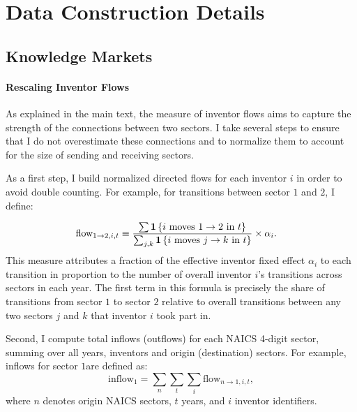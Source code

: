 
\appendix

\section{Data Construction Details\label{app: Data-Construction-Details}}

\subsection{Knowledge Markets}

\paragraph{Rescaling Inventor Flows}

As explained in the main text, the measure of inventor flows aims
to capture the strength of the connections between two sectors. I
take several steps to ensure that I do not overestimate these connections
and to normalize them to account for the size of sending and receiving
sectors. 

As a first step, I build normalized directed flows for each inventor
$i$ in order to avoid double counting. For example, for transitions
between sector $1$ and $2$, I define:

\begin{align*}
\text{flow}_{1\rightarrow2,i,t} & \equiv\frac{\sum\text{\ensuremath{\bm{1}\left\{ i\text{ moves }1\rightarrow2\text{ in }t\right\} }}}{\sum_{j,k}\text{\ensuremath{\bm{1}\left\{ i\text{ moves }j\rightarrow k\text{ in }t\right\} }}}\times\alpha_{i}.
\end{align*}
This measure attributes a fraction of the effective inventor fixed
effect $\alpha_{i}$ to each transition in proportion to the number
of overall inventor $i$'s transitions across sectors in each year.
The first term in this formula is precisely the share of transitions
from sector $1$ to sector $2$ relative to overall transitions between
any two sectors $j$ and $k$ that inventor $i$ took part in.

Second, I compute total inflows (outflows) for each NAICS 4-digit
sector, summing over all years, inventors and origin (destination)
sectors. For example, inflows for sector $1$are defined as:
\[
\text{inflow}_{1}=\sum_{n}\sum_{t}\sum_{i}\text{flow}{}_{n\rightarrow\text{1},i,t},
\]
where $n$ denotes origin NAICS sectors, $t$ years, and $i$ inventor
identifiers. 

